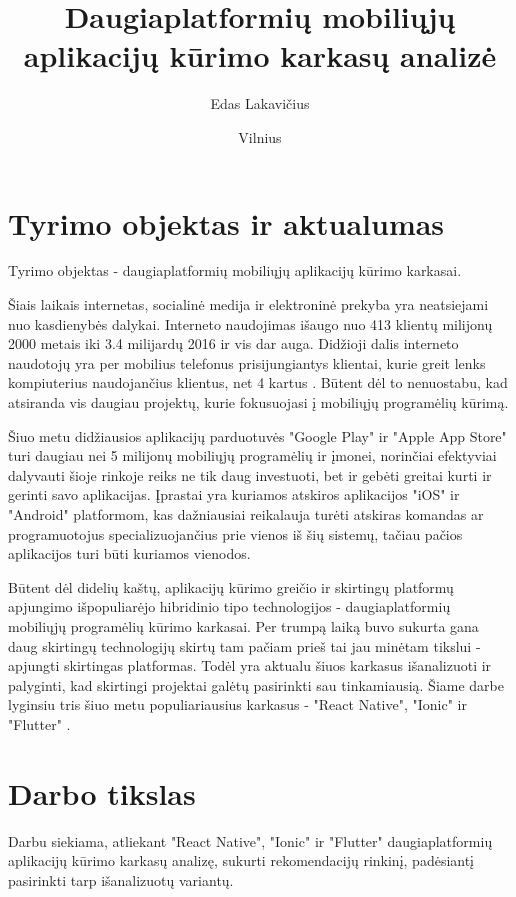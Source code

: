 \documentclass{VUMIFInfBakalaurinis}
\title{Daugiaplatformių mobiliųjų aplikacijų kūrimo karkasų analizė}
\author{Edas Lakavičius}
\date{Vilnius \\ \the\year}
\begin{document}
\maketitle

\tableofcontents

\section{Tyrimo objektas ir aktualumas}
Tyrimo objektas - daugiaplatformių mobiliųjų aplikacijų kūrimo karkasai.

Šiais laikais internetas, socialinė medija ir elektroninė prekyba yra neatsiejami nuo kasdienybės dalykai. Interneto naudojimas išaugo nuo 413 klientų milijonų 2000 metais iki 3.4 milijardų 2016 \cite{owidinternet} ir vis dar auga. Didžioji dalis interneto naudotojų yra per mobilius telefonus prisijungiantys klientai, kurie greit lenks kompiuterius naudojančius klientus, net 4 kartus \cite{internetusage}. Būtent dėl to nenuostabu, kad atsiranda vis daugiau projektų, kurie fokusuojasi į mobiliųjų programėlių kūrimą.

Šiuo metu didžiausios aplikacijų parduotuvės "Google Play" ir "Apple App Store" turi daugiau nei 5 milijonų mobiliųjų programėlių \cite{appcount} ir įmonei, norinčiai efektyviai dalyvauti šioje rinkoje reiks ne tik daug investuoti, bet ir gebėti greitai kurti ir gerinti savo aplikacijas. Įprastai yra kuriamos atskiros aplikacijos "iOS" ir "Android" platformom, kas dažniausiai reikalauja turėti atskiras komandas ar programuotojus specializuojančius prie vienos iš šių sistemų, tačiau pačios aplikacijos turi būti kuriamos vienodos.

Būtent dėl didelių kaštų, aplikacijų kūrimo greičio ir skirtingų platformų apjungimo išpopuliarėjo hibridinio tipo technologijos - daugiaplatformių mobiliųjų programėlių kūrimo karkasai. Per trumpą laiką buvo sukurta gana daug skirtingų technologijų skirtų tam pačiam prieš tai jau minėtam tikslui - apjungti skirtingas platformas. Todėl yra aktualu šiuos karkasus išanalizuoti ir palyginti, kad skirtingi projektai galėtų pasirinkti sau tinkamiausią. Šiame darbe lyginsiu tris šiuo metu populiariausius karkasus - "React Native", "Ionic" ir "Flutter" \cite{popularframeworks}.

\section{Darbo tikslas}
Darbu siekiama, atliekant "React Native", "Ionic" ir "Flutter" daugiaplatformių aplikacijų kūrimo karkasų analizę, sukurti rekomendacijų rinkinį, padėsiantį pasirinkti tarp išanalizuotų variantų.
\end{document}
